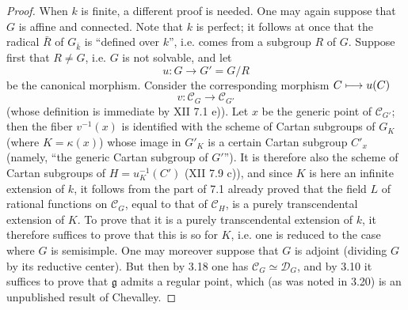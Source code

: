 \begin{proof}
When $k$ is finite, a different proof is needed.
One may again suppose that $G$ is affine and
connected. Note that $k$ is perfect; it follows
at once that the radical $\bar R$ of $G_{\bar k}$
is ``defined over $k$'', i.e. comes from a
subgroup $R$ of $G$. Suppose first that
$R\ne G$, i.e. $G$ is not solvable, and let
\[
 u:G\longrightarrow G'=G/R
\]
be the canonical morphism. Consider the
corresponding morphism $C\longmapsto u(C)$
\[
 v:\mathscr C_G\longrightarrow\mathscr C_{G'}
\]
(whose definition is immediate by XII 7.1 e)).
Let $x$ be the generic point of
$\mathscr C_{G'}$; then the fiber $v^{-1}(x)$
is identified with the scheme of Cartan
subgroups of $G_K$ (where $K=\kappa(x)$)
whose image in $G'_K$ is a certain Cartan
subgroup $C'_x$ (namely, ``the generic Cartan
subgroup of $G'$''). It is therefore also
the scheme of Cartan subgroups of
$H=u_K^{-1}(C')$ (XII 7.9 c)), and since
$K$ is here an infinite extension of $k$,
it follows from the part of 7.1 already
proved that the field $L$ of rational
functions on $\mathscr C_G$, equal to
that of $\mathscr C_H$, is a purely
transcendental extension of $K$. To prove
that it is a purely transcendental extension
of $k$, it therefore suffices to prove
that this is so for $K$, i.e. one is
reduced to the case where $G$ is
semisimple. One may moreover suppose
that $G$ is adjoint (dividing $G$ by
its reductive center). But then by
3.18 one has $\mathscr C_G\simeq\mathscr D_G$,
and by 3.10 it suffices to prove that
$\mathfrak g$ admits a regular point,
which (as was noted in 3.20) is an
unpublished result of Chevalley.


\end{proof}
